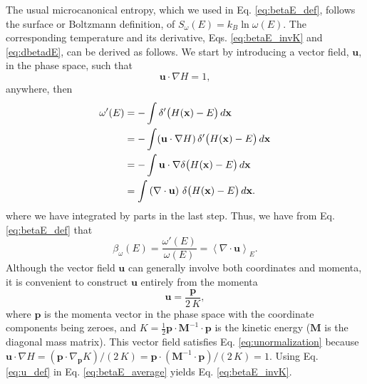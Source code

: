 \documentclass[reprint]{revtex4-1}
\begin{document}
The usual microcanonical entropy,
which we used in Eq. \eqref{eq:betaE_def},
follows the surface or Boltzmann definition\cite{dunkel2014, frenkel2015},
of $S_\omega(E) = k_B \ln \omega(E)$.
%
The corresponding temperature and its derivative,
Eqs. \eqref{eq:betaE_invK} and \eqref{eq:dbetadE},
can be derived as follows.
%
We start by introducing a vector field, $\mathbf u$,
in the phase space,
such that
%
\begin{equation}
  \mathbf u \cdot \nabla H = 1
  ,
  \label{eq:unormalization}
\end{equation}
%
anywhere, then
%
\begin{align}
  \omega'(E)
  &= -\int \delta'\bigl( H(\mathbf x) - E \bigr) \, d\mathbf x
     \notag \\
  &= -\int (\mathbf u \cdot \nabla H) \,
           \delta'\bigl( H(\mathbf x) - E \bigr) \, d\mathbf x
     \notag \\
  &= -\int \mathbf u \cdot
           \nabla \delta\bigl( H(\mathbf x) - E \bigr) \, d\mathbf x
     \notag \\
  &= \int
     \left( \nabla \cdot \mathbf u \right) \,
     \delta\bigl( H(\mathbf x) - E \bigr) \, d\mathbf x
  .
  \notag
\end{align}
%
where we have integrated by parts in the last step.
%
Thus, we have from Eq. \eqref{eq:betaE_def} that
%
\begin{equation}
  \beta_\omega(E)
  =
  \frac{ \omega'(E) } { \omega(E) }
  =
  \left\langle
    \nabla \cdot \mathbf u
  \right\rangle_E
  .
  \label{eq:betaE_average}
\end{equation}
%
Although the vector field $\mathbf u$ can generally
involve both coordinates and momenta,
it is convenient to construct $\mathbf u$
entirely from the momenta
%
\begin{equation}
  \mathbf u
  =
  \frac{ \mathbf p }
       {  2 \, K }
  ,
  \label{eq:u_def}
\end{equation}
where $\mathbf p$ is the momenta vector in the phase space
with the coordinate components being zeroes,
and $K = \frac 1 2 \mathbf p \cdot \mathbf M^{-1} \cdot \mathbf p$
is the kinetic energy ($\mathbf M$ is the diagonal mass matrix).
%
This vector field satisfies Eq. \eqref{eq:unormalization}
because
$\mathbf u \cdot \nabla H
= (\mathbf p \cdot \nabla_{\mathbf p} K)/(2 \, K)
= \mathbf p \cdot (\mathbf M^{-1} \cdot \mathbf p) / (2 \, K) = 1$.
%
Using Eq. \eqref{eq:u_def} in Eq. \eqref{eq:betaE_average}
yields Eq. \eqref{eq:betaE_invK}.
\end{document}
